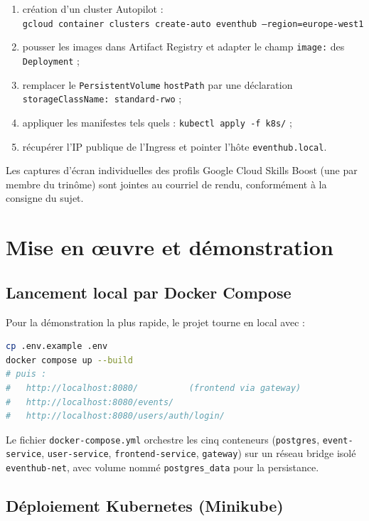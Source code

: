 \documentclass[11pt,a4paper]{article}
\newcommand{\code}[1]{\texttt{#1}}
\begin{document}
\begin{enumerate}
    \item création d'un cluster Autopilot : \\
          \code{gcloud container clusters create-auto eventhub --region=europe-west1}
    \item pousser les images dans Artifact Registry et adapter le champ \code{image:} des \code{Deployment} ;
    \item remplacer le \code{PersistentVolume} \code{hostPath} par une déclaration \code{storageClassName: standard-rwo} ;
    \item appliquer les manifestes tels quels : \code{kubectl apply -f k8s/} ;
    \item récupérer l'IP publique de l'Ingress et pointer l'hôte \code{eventhub.local}.
\end{enumerate}

Les captures d'écran individuelles des profils Google Cloud Skills Boost (une par membre du trinôme) sont jointes au courriel de rendu, conformément à la consigne du sujet.

\section{Mise en œuvre et démonstration}

\subsection{Lancement local par Docker Compose}

Pour la démonstration la plus rapide, le projet tourne en local avec :

\begin{lstlisting}[language=bash]
cp .env.example .env
docker compose up --build
# puis :
#   http://localhost:8080/          (frontend via gateway)
#   http://localhost:8080/events/
#   http://localhost:8080/users/auth/login/
\end{lstlisting}

Le fichier \code{docker-compose.yml} orchestre les cinq conteneurs (\code{postgres}, \code{event-service}, \code{user-service}, \code{frontend-service}, \code{gateway}) sur un réseau bridge isolé \code{eventhub-net}, avec volume nommé \code{postgres\_data} pour la persistance.

\subsection{Déploiement Kubernetes (Minikube)}
\end{document}
